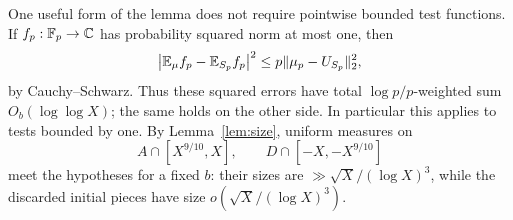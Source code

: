 One useful form of the lemma does not require pointwise bounded test
functions. If $f_p:\mathbb F_p\to\mathbb C$ has probability squared norm at most one,
then
\begin{equation}\label{eq:prelim-test-stability}
 \left|\mathbb E_\mu f_p-\mathbb E_{S_p}f_p\right|^2
 \le p\|\mu_p-U_{S_p}\|_2^2,
\end{equation}
by Cauchy--Schwarz. Thus these squared errors have total
$\log p/p$-weighted sum $O_b(\log\log X)$; the same holds on the other
side. In particular this applies to tests bounded by one.
By Lemma~\ref{lem:size}, uniform measures on
\[
 A\cap[X^{9/10},X],\qquad D\cap[-X,-X^{9/10}]
\]
meet the hypotheses for a fixed $b$: their sizes are
$\gg\sqrt X/(\log X)^3$, while the discarded initial pieces have
size $o(\sqrt X/(\log X)^3)$.

